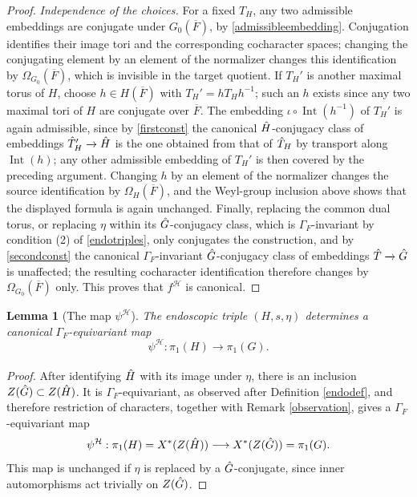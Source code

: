 \documentclass[11pt,a4paper]{article}
\theoremstyle{definition}
\theoremstyle{plain}
\newtheorem{Le}[shared]{Lemma}
\theoremstyle{remark}
\theoremstyle{plain}
\DeclareMathOperator{\Int}{Int}
\begin{document}
\begin{proof}
    \textit{Independence of the choices.} For a fixed $T_H$, any two admissible embeddings are conjugate under $G_0(\overline F)$, by \ref{admissibleembedding}. Conjugation identifies their image tori and the corresponding cocharacter spaces; changing the conjugating element by an element of the normalizer changes this identification by $\Omega_{G_0}(\overline F)$, which is invisible in the target quotient. If $T_H'$ is another maximal torus of $H$, choose $h\in H(\overline F)$ with $T_H'=hT_Hh^{-1}$; such an $h$ exists since any two maximal tori of $H$ are conjugate over $\overline{F}$. The embedding $\iota\circ\Int(h^{-1})$ of $T_H'$ is again admissible, since by \ref{firstconst} the canonical $\Hat{H}$-conjugacy class of embeddings $\Hat{T}_{H}' \xrightarrow[]{} \Hat{H}$ is the one obtained from that of $\Hat{T}_H$ by transport along $\Int(h)$; any other admissible embedding of $T_H'$ is then covered by the preceding argument. Changing $h$ by an element of the normalizer changes the source identification by $\Omega_H(\overline F)$, and the Weyl-group inclusion above shows that the displayed formula is again unchanged. Finally, replacing the common dual torus, or replacing $\eta$ within its $\Hat{G}$-conjugacy class, which is $\Gamma_F$-invariant by condition (2) of \ref{endotriples}, only conjugates the construction, and by \ref{secondconst} the canonical $\Gamma_F$-invariant $\Hat{G}$-conjugacy class of embeddings $\Hat{T} \xrightarrow[]{} \Hat{G}$ is unaffected; the resulting cocharacter identification therefore changes by $\Omega_{G_0}(\overline F)$ only. This proves that $f^{\mathcal H}$ is canonical.
\end{proof}

\begin{Le}[The map $\psi^{\mathcal H}$]\label{endoscopicpimap}
    The endoscopic triple $(H,s,\eta)$ determines a canonical $\Gamma_F$-equivariant map
    $$\psi^{\mathcal H}: \pi_1(H) \xrightarrow[]{} \pi_1(G).$$
\end{Le}
\begin{proof}
    After identifying $\Hat{H}$ with its image under $\eta$, there is an inclusion $Z(\Hat{G})\subset Z(\Hat{H})$. It is $\Gamma_F$-equivariant, as observed after Definition \ref{endodef}, and therefore restriction of characters, together with Remark \ref{observation}, gives a $\Gamma_F$-equivariant map
    $$\psi^{\mathcal H}:\pi_1(H)=X^*(Z(\Hat{H}))\longrightarrow X^*(Z(\Hat{G}))=\pi_1(G).$$
    This map is unchanged if $\eta$ is replaced by a $\Hat{G}$-conjugate, since inner automorphisms act trivially on $Z(\Hat{G})$.
\end{proof}
\end{document}
